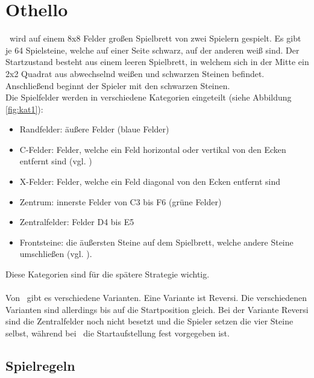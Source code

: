 \chapter{Othello}
\label{othello-chapter}
\ot\ wird auf einem 8x8 Felder großen Spielbrett von zwei Spielern gespielt. Es gibt je 64 Spielsteine, welche auf einer Seite schwarz, auf der anderen weiß sind. Der Startzustand besteht aus einem leeren Spielbrett, in welchem sich in der Mitte ein 2x2 Quadrat aus abwechselnd weißen und schwarzen Steinen befindet. Anschließend beginnt der Spieler mit den schwarzen Steinen.
\\Die Spielfelder werden in verschiedene Kategorien eingeteilt (siehe Abbildung
 \ref{fig:kat1}):
\begin{itemize}
\item Randfelder: äußere Felder (blaue Felder) \cite{wikibooks}
\item C-Felder: Felder, welche ein Feld horizontal oder vertikal von den Ecken entfernt sind (vgl. \cite{Berg})
\item X-Felder: Felder, welche ein Feld diagonal von den Ecken entfernt sind \cite{wikibooks}
\item Zentrum: innerste Felder von C3 bis F6 (grüne Felder) \cite{wikibooks}
\item Zentralfelder: Felder D4 bis E5 \cite{wikibooks}
\item Frontsteine: die äußersten Steine auf dem Spielbrett, welche andere Steine umschließen (vgl. \cite{Ortiz.}).
\end{itemize}
Diese Kategorien sind für die spätere Strategie wichtig.
\\
\\Von \ot\ gibt es verschiedene Varianten. Eine Variante ist Reversi.
Die verschiedenen Varianten sind allerdings bis auf die Startposition gleich. Bei der Variante Reversi sind die Zentralfelder noch nicht besetzt und die Spieler setzen die vier Steine selbst, während bei \ot\ die Startaufstellung fest vorgegeben ist.

\section{Spielregeln}

